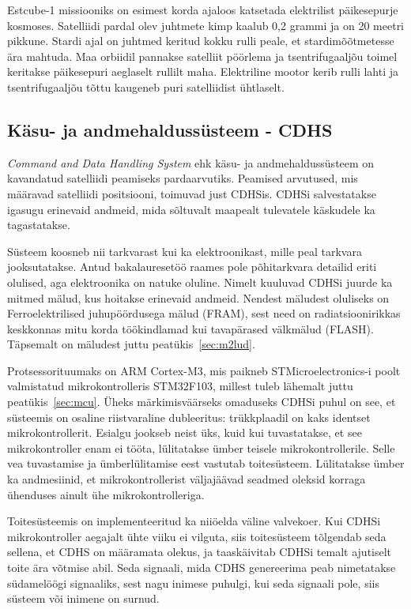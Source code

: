 \documentclass[12pt,a4paper]{article}
\begin{document}
Estcube-1 missiooniks on esimest korda ajaloos katsetada elektrilist
päikesepurje kosmoses. Satelliidi pardal olev juhtmete kimp kaalub 0,2 grammi ja
on 20 meetri pikkune. Stardi ajal on juhtmed keritud kokku rulli peale, et
stardimõõtmetesse ära mahtuda. Maa orbiidil pannakse satelliit pöörlema ja
tsentrifugaaljõu toimel keritakse päikesepuri aeglaselt rullilt maha.
Elektriline mootor kerib rulli lahti ja tsentrifugaaljõu tõttu kaugeneb puri
satelliidist ühtlaselt.
\subsection{Käsu- ja andmehaldussüsteem - CDHS}
\textit{Command and Data Handling System} ehk käsu- ja andmehaldussüsteem on
kavandatud satelliidi peamiseks pardaarvutiks. Peamised arvutused, mis määravad
satelliidi positsiooni, toimuvad just CDHSis. CDHSi salvestatakse igasugu
erinevaid andmeid, mida sõltuvalt maapealt tulevatele käskudele ka tagastatakse.

Süsteem koosneb nii tarkvarast kui ka elektroonikast, mille peal tarkvara
jooksutatakse. Antud bakalauresetöö raames pole põhitarkvara detailid eriti
olulised, aga elektroonika on natuke oluline. Nimelt kuuluvad CDHSi juurde ka
mitmed mälud, kus hoitakse erinevaid andmeid. Nendest mäludest oluliseks on
Ferroelektrilised juhupöördusega mälud (FRAM), sest need on radiatsioonirikkas
keskkonnas mitu korda töökindlamad kui tavapärased välkmälud (FLASH). Täpsemalt
on mäludest juttu peatükis~\ref{sec:m2lud}.

Protsessorituumaks on ARM Cortex-M3, mis paikneb STMicroelectronics-i poolt
valmistatud mikrokontrolleris STM32F103, millest tuleb lähemalt juttu
peatükis~\ref{sec:mcu}. Üheks märkimisväärseks omaduseks CDHSi puhul on see, et
süsteemis on osaline riistvaraline dubleeritus: trükkplaadil on kaks identset
mikrokontrollerit. Esialgu jookseb neist üks, kuid kui tuvastatakse, et see
mikrokontroller enam ei tööta, lülitatakse ümber teisele mikrokontrollerile.
Selle vea tuvastamise ja ümberlülitamise eest vastutab toitesüsteem. Lülitatakse
ümber ka andmesiinid, et mikrokontrollerist väljajäävad seadmed oleksid korraga
ühenduses ainult ühe mikrokontrolleriga.

Toitesüsteemis on implementeeritud ka niiöelda väline valvekoer. Kui CDHSi
mikrokontroller aegajalt ühte viiku ei vilguta, siis toitesüsteem tõlgendab seda
sellena, et CDHS on määramata olekus, ja taaskäivitab CDHSi temalt ajutiselt
toite ära võtmise abil. Seda signaali, mida CDHS genereerima peab nimetatakse
südamelöögi signaaliks, sest nagu inimese puhulgi, kui seda signaali pole, siis
süsteem või inimene on surnud.
\end{document}
